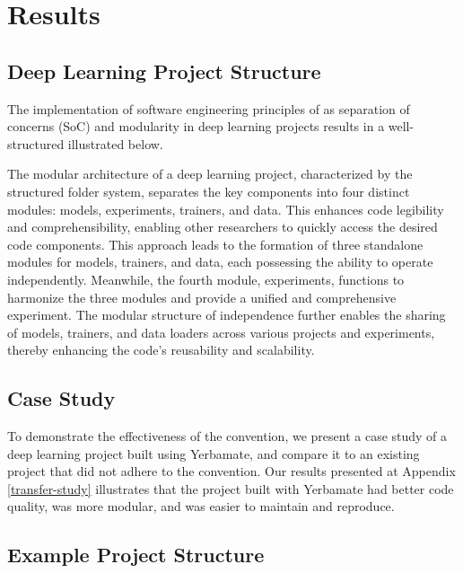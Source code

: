 
\section{Results}

\subsection{Deep Learning Project Structure}

The implementation of software engineering principles of as separation of concerns (SoC) and modularity in deep learning projects results in a well-structured illustrated below. 
\vspace{0.7em}


The modular architecture of a deep learning project, characterized by the structured folder system, separates the key components into four distinct modules: models, experiments, trainers, and data. This enhances code legibility and comprehensibility, enabling other researchers to quickly access the desired code components. This approach leads to the formation of three standalone modules for models, trainers, and data, each possessing the ability to operate independently. Meanwhile, the fourth module, experiments, functions to harmonize the three modules and provide a unified and comprehensive experiment. The modular structure of independence further enables the sharing of models, trainers, and data loaders across various projects and experiments, thereby enhancing the code's reusability and scalability. 

\subsection{Case Study}
 To demonstrate the effectiveness of the convention, we present a case study of a deep learning project built using Yerbamate, and compare it to an existing project that did not adhere to the convention. Our results presented at Appendix \ref{transfer-study} illustrates that the project built with Yerbamate had better code quality, was more modular, and was easier to maintain and reproduce.
 
\subsection{Example Project Structure}

